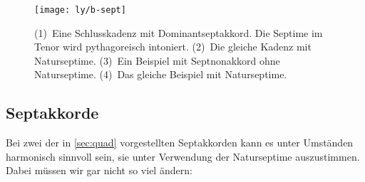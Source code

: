 \begin{figure}
  \centering
  \texttt{[image: ly/b-sept]}
  \caption{(1)~Eine Schlusskadenz mit Dominantseptakkord. Die Septime im
    Tenor wird pythagoreisch intoniert.
    \quad(2)~Die gleiche Kadenz mit Naturseptime.
    \quad(3)~Ein Beispiel mit Septnonakkord ohne Naturseptime.
    \quad(4)~Das gleiche Beispiel mit Naturseptime.}\label{fig:sept}
\end{figure}

\subsection{Septakkorde}

Bei zwei der in \cref{sec:quad} vorgestellten Septakkorden kann es unter
Umständen harmonisch sinnvoll sein, sie unter Verwendung der Naturseptime
auszustimmen.  Dabei müssen wir gar nicht so viel ändern:


